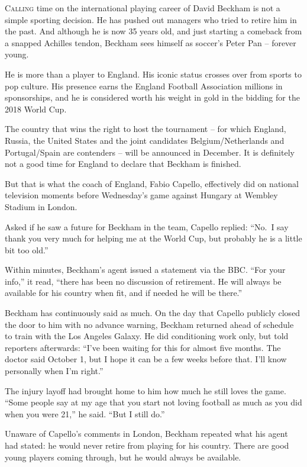 ﻿\documentclass[12pt]{article}
\begin{document}
\lettrine{C}{alling} time on the international playing career of David
Beckham is not a simple sporting decision. He has pushed out managers who tried to retire him in the
past. And although he is now 35 years old, and just starting a comeback from a snapped Achilles
tendon, Beckham sees himself as soccer's Peter Pan -- forever young.

He is more than a player to England. His iconic status crosses over from sports to pop culture. His
presence earns the England Football Association millions in sponsorships, and he is considered worth
his weight in gold in the bidding for the 2018 World Cup.

The country that wins the right to host the tournament -- for which England, Russia, the United
States and the joint candidates Belgium/Netherlands and Portugal/Spain are contenders -- will be
announced in December. It is definitely not a good time for England to declare that Beckham is
finished.

But that is what the coach of England, Fabio Capello, effectively did on national television moments
before Wednesday's game against Hungary at Wembley Stadium in London.

Asked if he saw a future for Beckham in the team, Capello replied: ``No.~I say thank you very much
for helping me at the World Cup, but probably he is a little bit too old.''

Within minutes, Beckham's agent issued a statement via the BBC. ``For your info,'' it read, ``there
has been no discussion of retirement. He will always be available for his country when fit, and if
needed he will be there.''

Beckham has continuously said as much. On the day that Capello publicly closed the door to him with
no advance warning, Beckham returned ahead of schedule to train with the Los Angeles Galaxy. He did
conditioning work only, but told reporters afterwards: ``I've been waiting for this for almost five
months. The doctor said October 1, but I hope it can be a few weeks before that. I'll know
personally when I'm right.''

The injury layoff had brought home to him how much he still loves the game. ``Some people say at my
age that you start not loving football as much as you did when you were 21,'' he said. ``But I still
do.''

Unaware of Capello's comments in London, Beckham repeated what his agent had stated: he would never
retire from playing for his country. There are good young players coming through, but he would
always be available.
\end{document}
